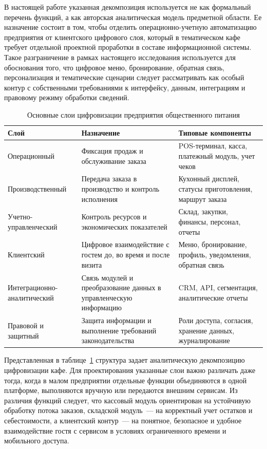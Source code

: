 В настоящей работе указанная декомпозиция используется не как формальный перечень функций, а как авторская аналитическая модель предметной области. Ее назначение состоит в том, чтобы отделить операционно-учетную автоматизацию предприятия от клиентского цифрового слоя, который в тематическом кафе требует отдельной проектной проработки в составе информационной системы. Такое разграничение в рамках настоящего исследования используется для обоснования того, что цифровое меню, бронирование, обратная связь, персонализация и тематические сценарии следует рассматривать как особый контур с собственными требованиями к интерфейсу, данным, интеграциям и правовому режиму обработки сведений.

\begin{table}[H]
\centering
\small
\caption{Основные слои цифровизации предприятия общественного питания}
\label{tab:cafe_digital_layers}
\begin{tabularx}{\textwidth}{|>{\raggedright\arraybackslash}p{}|>{\raggedright\arraybackslash}p{}|>{\raggedright\arraybackslash}X|}
\hline
\textbf{Слой} & \textbf{Назначение} & \textbf{Типовые компоненты} \\ \hline
Операционный & Фиксация продаж и обслуживание заказа & POS-терминал, касса, платежный модуль, учет чеков \\ \hline
Производственный & Передача заказа в производство и контроль исполнения & Кухонный дисплей, статусы приготовления, маршрут заказа \\ \hline
Учетно-\linebreak управленческий & Контроль ресурсов и экономических показателей & Склад, закупки, финансы, персонал, отчеты \\ \hline
Клиентский & Цифровое взаимодействие с гостем до, во время и после визита & Меню, бронирование, профиль, уведомления, обратная связь \\ \hline
Интеграционно-\linebreak аналитический & Связь модулей и преобразование данных в управленческую информацию & CRM, API, сегментация, аналитические отчеты \\ \hline
Правовой и защитный & Защита информации и выполнение требований законодательства & Роли доступа, согласия, хранение данных, журналирование \\ \hline
\end{tabularx}
\normalsize
\end{table}

Представленная в таблице~\ref{tab:cafe_digital_layers} структура задает аналитическую декомпозицию цифровизации кафе. Для проектирования указанные слои важно различать даже тогда, когда в малом предприятии отдельные функции объединяются в одной платформе, выполняются вручную или передаются внешним сервисам. Из различия функций следует, что кассовый модуль ориентирован на устойчивую обработку потока заказов, складской модуль~--- на корректный учет остатков и себестоимости, а клиентский контур~--- на понятное, безопасное и удобное взаимодействие гостя с сервисом в условиях ограниченного времени и мобильного доступа.

